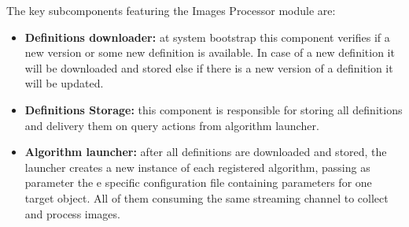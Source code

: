 The key subcomponents featuring the Images Processor module are:
% 
% 
%
%
\begin{itemize}

\item \textbf{Definitions downloader:} at system bootstrap this component verifies if a new version or some new definition is available. In case of a new definition it will be downloaded and stored else if there is a new version of a definition it will be updated.
\item \textbf{Definitions Storage:} this component is responsible for storing all definitions and delivery them on query actions from algorithm launcher.
\item \textbf{Algorithm launcher:} after all definitions are downloaded and stored, the launcher creates a new instance of each registered algorithm, passing as parameter the e specific configuration file containing parameters for one target object. All of them consuming the same streaming channel to collect and process images.
\end{itemize}
 
